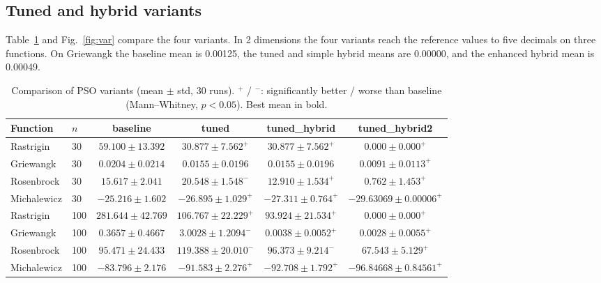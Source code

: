 \documentclass[conference]{IEEEtran}
\begin{document}
\subsection{Tuned and hybrid variants}
Table~\ref{tab:var} and Fig.~\ref{fig:var} compare the four variants. In
2 dimensions the four variants reach the reference values to five decimals on three functions. On Griewangk the baseline mean is 0.00125, the tuned and simple hybrid means are 0.00000, and the enhanced hybrid mean is 0.00049.

\begin{table}[t]
\centering
\caption{Comparison of PSO variants (mean $\pm$ std, 30 runs). $^{+}$ / $^{-}$:
significantly better / worse than baseline (Mann--Whitney, $p<0.05$).
Best mean in bold.}
\label{tab:var}
\begin{tabular}{llcccc}
\toprule
Function & $n$ & baseline & tuned & tuned\_hybrid & tuned\_hybrid2\\
\midrule
Rastrigin   & 30  & $59.100\pm13.392$ & $30.877\pm7.562^{+}$ & $30.877\pm7.562^{+}$ & $\mathbf{0.000}\pm0.000^{+}$\\
Griewangk   & 30  & $0.0204\pm0.0214$ & $0.0155\pm0.0196$ & $0.0155\pm0.0196$ & $\mathbf{0.0091}\pm0.0113^{+}$\\
Rosenbrock  & 30  & $15.617\pm2.041$ & $20.548\pm1.548^{-}$ & $12.910\pm1.534^{+}$ & $\mathbf{0.762}\pm1.453^{+}$\\
Michalewicz & 30  & $-25.216\pm1.602$ & $-26.895\pm1.029^{+}$ & $-27.311\pm0.764^{+}$ & $\mathbf{-29.63069}\pm0.00006^{+}$\\
\midrule
Rastrigin   & 100 & $281.644\pm42.769$ & $106.767\pm22.229^{+}$ & $93.924\pm21.534^{+}$ & $\mathbf{0.000}\pm0.000^{+}$\\
Griewangk   & 100 & $0.3657\pm0.4667$ & $3.0028\pm1.2094^{-}$ & $0.0038\pm0.0052^{+}$ & $\mathbf{0.0028}\pm0.0055^{+}$\\
Rosenbrock  & 100 & $95.471\pm24.433$ & $119.388\pm20.010^{-}$ & $96.373\pm9.214^{-}$ & $\mathbf{67.543}\pm5.129^{+}$\\
Michalewicz & 100 & $-83.796\pm2.176$ & $-91.583\pm2.276^{+}$ & $-92.708\pm1.792^{+}$ & $\mathbf{-96.84668}\pm0.84561^{+}$\\
\bottomrule
\end{tabular}
\end{table}
\end{document}
